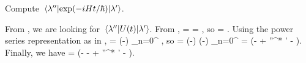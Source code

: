 \newcommand{\klamp}{\ket{\lam'}}
\newcommand{\bkll}{\braket*{\lam''}{\lam'}}

\begin{problem}
	Compute $\mel*{\lambda''}{\exp(-i H t / \hbar)}{\lambda'}$.
\end{problem}

\begin{solution}
	From , we are looking for $\mel*{\lambda''}{U(t)}{\lambda'}$.  From ,
	\beq
		\Ut \klam = \emiwtf \klamt \implies \Ut \klamp = \emiwtf {},
	\eeq
	so
	\beq
		 = \emiwtf {}.
	\eeq
	Using the power series representation as in ,
	\beq
		 = \exp(-) \sum_{n=0}^\infty {} \kn,
	\eeq
	so
	\beq
		 = \exp(-) \exp(-) \sum_{n=0}^\infty {}  = \exp(- + {\lam''}^* \lam' \emiwt - ).
	\eeq
	Finally, we have
	\beq
		 = \exp(-  -  + {\lam''}^* \lam' \emiwt - ).
	\eeq
\end{solution}